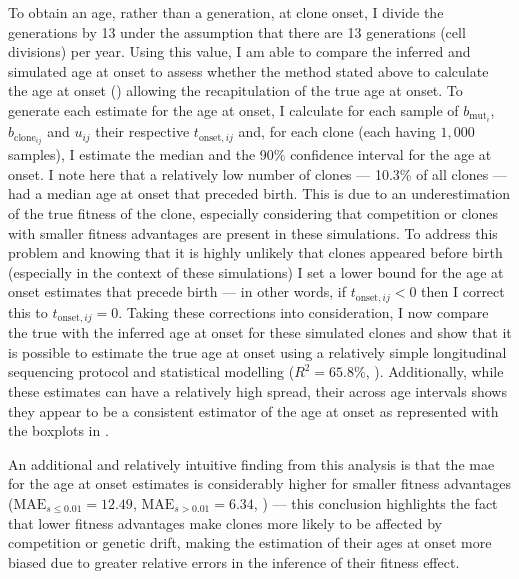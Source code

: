To obtain an age, rather than a generation, at clone onset, I divide the generations by 13 under the assumption that there are 13 generations (cell divisions) per year. Using this value, I am able to compare the inferred and simulated age at onset to assess whether the method stated above to calculate the age at onset () allowing the recapitulation of the true age at onset. To generate each estimate for the age at onset, I calculate for each sample of $b_{\mathrm{mut}_i}$, $b_{\mathrm{clone}_{ij}}$ and $u_{ij}$ their respective $t_{\mathrm{onset},ij}$ and, for each clone (each having $1,000$ samples), I estimate the median and the 90\% confidence interval for the age at onset. I note here that a relatively low number of clones --- 10.3\% of all clones --- had a median age at onset that preceded birth. This is due to an underestimation of the true fitness of the clone, especially considering that competition or clones with smaller fitness advantages are present in these simulations. To address this problem and knowing that it is highly unlikely that clones appeared before birth (especially in the context of these simulations) I set a lower bound for the age at onset estimates that precede birth --- in other words, if $t_{\mathrm{onset},ij} < 0$ then I correct this to $t_{\mathrm{onset},ij}=0$. Taking these corrections into consideration, I now compare the true with the inferred age at onset for these simulated clones and show that it is possible to estimate the true age at onset using a relatively simple longitudinal sequencing protocol and statistical modelling ($R^2 = 65.8\%$, ). Additionally, while these estimates can have a relatively high spread, their across age intervals shows they appear to be a consistent estimator of the age at onset as represented with the boxplots in . 

\begin{figure}[!ht]
	\label{fig:age-at-onset-sim}
\end{figure}

An additional and relatively intuitive finding from this analysis is that the \ac{mae} for the age at onset estimates is considerably higher for smaller fitness advantages ($\mathrm{MAE}_{s \leq 0.01} = 12.49$, $\mathrm{MAE}_{s > 0.01} = 6.34$, ) --- this conclusion highlights the fact that lower fitness advantages make clones more likely to be affected by competition or genetic drift, making the estimation of their ages at onset more biased due to greater relative errors in the inference of their fitness effect. 

